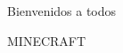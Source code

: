 \documentclass[12pt]{article}
\begin{document}
    Bienvenidos a todos

    \begin{center}
        MINECRAFT
    \end{center}
\end{document}
